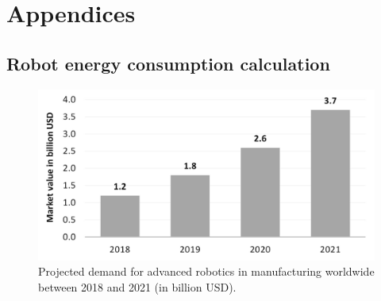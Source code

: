 \section*{Appendices}
\begin{appendices}
	
	\section{Robot energy consumption calculation}\label{sec:app_robot_ener_consumption}
	
	
\begin{figure}[!t]
	\centering
	\includegraphics[width= 0.9\columnwidth]{fig/advanced_robots_in_manufacturing_projected_global_demand}
	\caption{Projected demand for advanced robotics in manufacturing worldwide between 2018 and 2021 (in billion USD).}
	\label{fig:advanced_robots_in_manufacturing_projected_global_demand}
\end{figure}	
	

\end{appendices}
